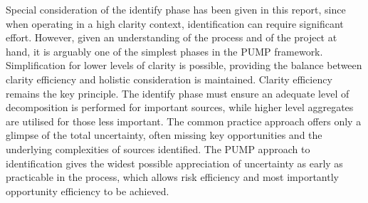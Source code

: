 Special consideration of the identify phase has been given in this report, since when operating in a high clarity context, identification can require significant effort.
However, given an understanding of the process and of the project at hand, it is arguably one of the simplest phases in the PUMP framework.
Simplification for lower levels of clarity is possible, providing the balance between clarity efficiency and holistic consideration is maintained.
Clarity efficiency remains the key principle.
The identify phase must ensure an adequate level of decomposition is performed for important sources, while higher level aggregates are utilised for those less important.
The common practice approach offers only a glimpse of the total uncertainty, often missing key opportunities and the underlying complexities of sources identified.
The PUMP approach to identification gives the widest possible appreciation of uncertainty as early as practicable in the process, which allows risk efficiency and most importantly opportunity efficiency to be achieved.









